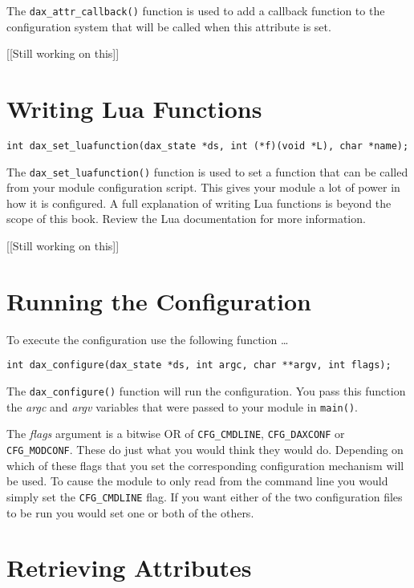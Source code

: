 The \verb|dax_attr_callback()| function is used to add a callback function to the configuration system that will be called when this attribute is set.

[[Still working on this]]

\section{Writing Lua Functions}

\begin{verbatim}
int dax_set_luafunction(dax_state *ds, int (*f)(void *L), char *name);
\end{verbatim}

The \verb|dax_set_luafunction()| function is used to set a function that can be called from your module configuration script.  This gives your module a lot of power in how it is configured.  A full explanation of writing Lua functions is beyond the scope of this book.  Review the Lua documentation for more information.

[[Still working on this]] 

\section{Running the Configuration}
To execute the configuration use the following function \ldots
\begin{verbatim}
int dax_configure(dax_state *ds, int argc, char **argv, int flags);
\end{verbatim}

The \verb|dax_configure()| function will run the configuration.  You pass this function the \textit{argc} and \textit{argv} variables that were passed to your module in \verb|main()|.

The \textit{flags} argument is a bitwise OR of \verb|CFG_CMDLINE|, \verb|CFG_DAXCONF| or \verb|CFG_MODCONF|.  These do just what you would think they would do.  Depending on which of these flags that you set the corresponding configuration mechanism will be used.  To cause the module to only read from the command line you would simply set the \verb|CFG_CMDLINE| flag. If you want either of the two configuration files to be run you would set one or both of the others.

\section{Retrieving Attributes}

